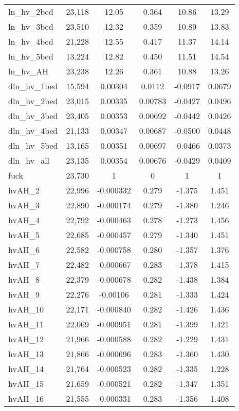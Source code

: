 \begin{tabular}{lccccc}
ln\_hv\_2bed & 23,118 & 12.05 & 0.364 & 10.86 & 13.29 \\
ln\_hv\_3bed & 23,510 & 12.32 & 0.359 & 10.89 & 13.83 \\
ln\_hv\_4bed & 21,228 & 12.55 & 0.417 & 11.37 & 14.14 \\
ln\_hv\_5bed & 13,224 & 12.82 & 0.450 & 11.51 & 14.54 \\
ln\_hv\_AH & 23,238 & 12.26 & 0.361 & 10.88 & 13.26 \\
dln\_hv\_1bed & 15,594 & 0.00304 & 0.0112 & -0.0917 & 0.0679 \\
dln\_hv\_2bed & 23,015 & 0.00335 & 0.00783 & -0.0427 & 0.0496 \\
dln\_hv\_3bed & 23,405 & 0.00353 & 0.00692 & -0.0442 & 0.0426 \\
dln\_hv\_4bed & 21,133 & 0.00347 & 0.00687 & -0.0500 & 0.0448 \\
dln\_hv\_5bed & 13,165 & 0.00351 & 0.00697 & -0.0466 & 0.0373 \\
dln\_hv\_all & 23,135 & 0.00354 & 0.00676 & -0.0429 & 0.0409 \\
fuck & 23,730 & 1 & 0 & 1 & 1 \\
hvAH\_2 & 22,996 & -0.000332 & 0.279 & -1.375 & 1.451 \\
hvAH\_3 & 22,890 & -0.000174 & 0.279 & -1.380 & 1.246 \\
hvAH\_4 & 22,792 & -0.000463 & 0.278 & -1.273 & 1.456 \\
hvAH\_5 & 22,685 & -0.000457 & 0.279 & -1.340 & 1.451 \\
hvAH\_6 & 22,582 & -0.000758 & 0.280 & -1.357 & 1.376 \\
hvAH\_7 & 22,482 & -0.000667 & 0.283 & -1.378 & 1.415 \\
hvAH\_8 & 22,379 & -0.000678 & 0.282 & -1.438 & 1.384 \\
hvAH\_9 & 22,276 & -0.00106 & 0.281 & -1.333 & 1.424 \\
hvAH\_10 & 22,171 & -0.000840 & 0.282 & -1.426 & 1.436 \\
hvAH\_11 & 22,069 & -0.000951 & 0.281 & -1.399 & 1.421 \\
hvAH\_12 & 21,966 & -0.000588 & 0.282 & -1.229 & 1.431 \\
hvAH\_13 & 21,866 & -0.000696 & 0.283 & -1.360 & 1.430 \\
hvAH\_14 & 21,764 & -0.000523 & 0.282 & -1.335 & 1.228 \\
hvAH\_15 & 21,659 & -0.000521 & 0.282 & -1.347 & 1.351 \\
hvAH\_16 & 21,555 & -0.000331 & 0.283 & -1.356 & 1.408 \\

\end{tabular}
